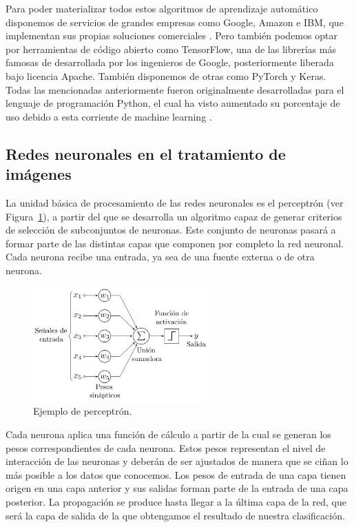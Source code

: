 Para poder materializar todos estos algoritmos de aprendizaje automático disponemos de servicios de grandes empresas como Google, Amazon e IBM, que
implementan sus propias soluciones comerciales \cite{cloudComputing}.
Pero también podemos optar por herramientas de código abierto como TensorFlow, una de las librerías más famosas de  desarrollada por los ingenieros de Google, posteriormente liberada bajo licencia Apache.
También disponemos de otras como PyTorch y Keras.
Todas las mencionadas anteriormente fueron originalmente desarrolladas para el lenguaje de programación Python, el cual ha visto aumentado su porcentaje de uso debido a esta corriente de
machine learning \cite{python_machine}.

\subsection{Redes neuronales en el tratamiento de imágenes}\label{subsec:redes-neuronales-en-el-tratamiento-de-imágenes}
La unidad básica de procesamiento de las redes neuronales es el perceptrón (ver Figura~\ref{fig:Perceptrón_}),
a partir del que se desarrolla un algoritmo capaz de generar criterios de selección de subconjuntos de neuronas.
Este conjunto de neuronas pasará a formar parte de las distintas capas que componen por completo la red neuronal.
Cada neurona recibe una entrada, ya sea de una fuente externa o de otra neurona.

\begin{figure}[H]
    \centering
    \includegraphics[width=0.6\textwidth]{images/chapter1/perceptron.png}
    \caption{Ejemplo de perceptrón.}
    \label{fig:Perceptrón_}
\end{figure}

Cada neurona aplica una función de cálculo a partir de la cual se generan los pesos correspondientes de cada neurona. Estos pesos representan el nivel de interacción de las neuronas y deberán de ser ajustados de manera que se ciñan lo más posible a los datos que conocemos.
Los pesos de entrada de una capa tienen origen en una capa anterior y sus salidas forman parte de la entrada de una capa posterior. La propagación se produce hasta llegar a la última capa de la red, que será la capa de salida de la que obtengamos el resultado de nuestra clasificación.

